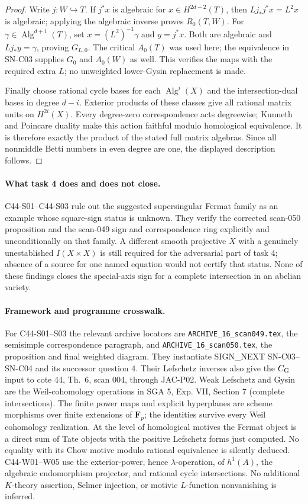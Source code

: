 \documentclass[11pt]{article}
\theoremstyle{remark}\newtheorem{remark}[theorem]{Remark}
\begin{document}
\begin{proof}
Write $j:W\hookrightarrow T$.  If $j^*x$ is algebraic
for $x\in H^{2d-2}(T)$, then
$L j_*j^*x=L^2x$ is algebraic; applying the algebraic
inverse proves $R_0(T,W)$.  For
$\gamma\in\operatorname{Alg}^{d+1}(T)$, set
$x=(L^2)^{-1}\gamma$ and $y=j^*x$.  Both are
algebraic and $Lj_*y=\gamma$, proving $G_{L,0}$.
The critical $A_0(T)$ was used here; the equivalence
in SN-C03 supplies $G_0$ and $A_0(W)$ as well.
This verifies the maps with the required extra $L$;
no unweighted lower-Gysin replacement is made.

Finally choose rational cycle bases for each
$\operatorname{Alg}^i(X)$ and the intersection-dual
bases in degree $d-i$.  Exterior products of these
classes give all rational matrix units on
$H^{2i}(X)$.  Every degree-zero correspondence
acts degreewise; Kunneth and Poincare duality make
this action faithful modulo homological equivalence.
It is therefore exactly the product of the stated
full matrix algebras.  Since all nonmiddle Betti
numbers in even degree are one, the displayed
description follows.
\end{proof}

\paragraph{What task 4 does and does not close.}
C44-S01--C44-S03 rule out the suggested supersingular Fermat
family as an example whose square-sign status is unknown.
They verify the corrected scan-050 proposition and the
scan-049 sign and correspondence ring explicitly and
unconditionally on that family.  A different smooth
projective $X$ with a genuinely unestablished $I(X\times X)$
is still required for the adversarial part of task 4; absence
of a source for one named equation would not certify that
status.  None of these findings closes the special-axis
sign for a complete intersection in an abelian variety.

\paragraph{Framework and programme crosswalk.}
For C44-S01--S03 the relevant archive locators are
\texttt{ARCHIVE\_16\_scan049.tex}, the semisimple
correspondence paragraph, and
\texttt{ARCHIVE\_16\_scan050.tex}, the proposition and
final weighted diagram.  They instantiate SIGN\_NEXT
SN-C03--SN-C04 and its successor question 4.  Their
Lefschetz inverses also give the $C_{\rm G}$ input to
cote 44, Th.~6, scan 004, through JAC-P02.  Weak
Lefschetz and Gysin are the Weil-cohomology operations
in SGA 5, Exp. VII, Section 7 (complete intersections).
The finite power maps and explicit hyperplanes are
scheme morphisms over finite extensions of $\mathbf F_p$;
the identities survive every Weil cohomology realization.
At the level of homological motives the Fermat object
is a direct sum of Tate objects with the positive
Lefschetz forms just computed.  No equality with its
Chow motive modulo rational equivalence is silently
deduced.  C44-W01--W05 use the exterior-power, hence
$\lambda$-operation, of $h^1(A)$, the algebraic
endomorphism projector, and rational cycle intersections.
No additional $K$-theory assertion, Selmer injection,
or motivic $L$-function nonvanishing is inferred.
\end{document}
